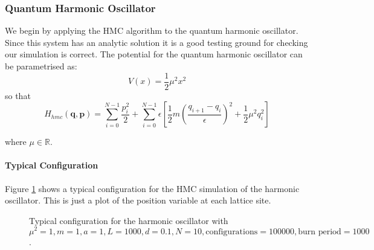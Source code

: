 \documentclass[12pt]{article}
\begin{document}
         
            

    
        \subsubsection{Quantum Harmonic Oscillator}
            \label{sec:QuantumHarmonicOscillator}
            We begin by applying the HMC algorithm to the quantum harmonic oscillator. Since this system has an analytic solution it is a good testing ground for checking our simulation is correct. The potential for the quantum harmonic oscillator can be parametrised as:
            \begin{equation}
                \label{eq:HarmonicPotential}
                V\left(x\right) = \frac{1}{2}\mu^2x^2
            \end{equation}
            so that 
            \begin{equation}
                \label{eq:HarmonicPotential}
                H_{hmc}\left(\bm{q},\bm{p}\right) = \sum_{i=0}^{N-1} \frac{p_i^2}{2} + \sum_{i=0}^{N-1} \epsilon \left[\frac{1}{2}m\left(\frac{q_{i+1}-q_{i}}{\epsilon}\right)^2 + \frac{1}{2}\mu^2q_i^2\right]
            \end{equation}

            where $\mu \in \mathbb{R}$.

            \paragraph{Typical Configuration}
                Figure \ref{fig:TypicalHarmonicPath} shows a typical configuration for the HMC simulation of the harmonic oscillator. This is just a plot of the position variable at each lattice site. 
                \begin{figure}
                    \centering
                        \caption{Typical configuration for the harmonic oscillator with $\mu^2 = 1, m = 1, a = 1, L = 1000, d = 0.1, N = 10, \text{configurations} = 100000, \text{burn period} = 1000$.}
                        \label{fig:TypicalHarmonicPath}
                \end{figure}
\end{document}

